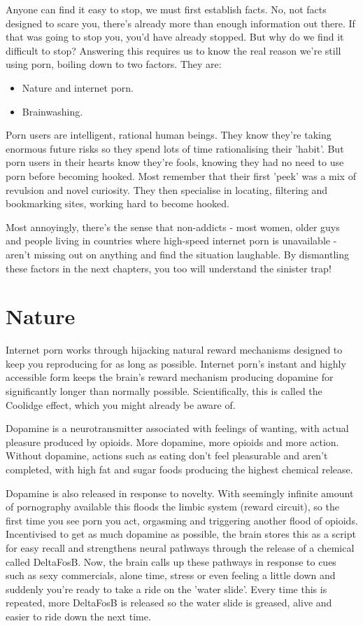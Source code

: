 \documentclass[
]{book}
\begin{document}
Anyone can find it easy to stop, we must first establish facts. No, not facts designed to scare you, there's already more than enough information out there. If that was going to stop you, you'd have already stopped. But why do we find it difficult to stop? Answering this requires us to know the real reason we're still using porn, boiling down to two factors. They are:

\begin{itemize}
\item
  Nature and internet porn.
\item
  Brainwashing.
\end{itemize}

Porn users are intelligent, rational human beings. They know they're taking enormous future risks so they spend lots of time rationalising their 'habit'. But porn users in their hearts know they're fools, knowing they had no need to use porn before becoming hooked. Most remember that their first 'peek' was a mix of revulsion and novel curiosity. They then specialise in locating, filtering and bookmarking sites, working hard to become hooked.

Most annoyingly, there's the sense that non-addicts - most women, older guys and people living in countries where high-speed internet porn is unavailable - aren't missing out on anything and find the situation laughable. By dismantling these factors in the next chapters, you too will understand the sinister trap!

\hypertarget{nature}{%
\chapter{Nature}\label{nature}}

Internet porn works through hijacking natural reward mechanisms designed to keep you reproducing for as long as possible. Internet porn's instant and highly accessible form keeps the brain's reward mechanism producing dopamine for significantly longer than normally possible. Scientifically, this is called the Coolidge effect, which you might already be aware of.

Dopamine is a neurotransmitter associated with feelings of wanting, with actual pleasure produced by opioids. More dopamine, more opioids and more action. Without dopamine, actions such as eating don't feel pleasurable and aren't completed, with high fat and sugar foods producing the highest chemical release.

Dopamine is also released in response to novelty. With seemingly infinite amount of pornography available this floods the limbic system (reward circuit), so the first time you see porn you act, orgasming and triggering another flood of opioids. Incentivised to get as much dopamine as possible, the brain stores this as a script for easy recall and strengthens neural pathways through the release of a chemical called DeltaFosB. Now, the brain calls up these pathways in response to cues such as sexy commercials, alone time, stress or even feeling a little down and suddenly you're ready to take a ride on the 'water slide'. Every time this is repeated, more DeltaFosB is released so the water slide is greased, alive and easier to ride down the next time.
\end{document}
